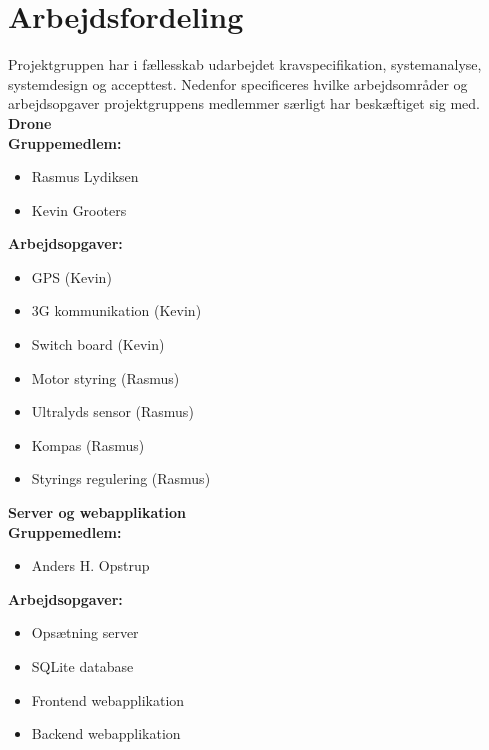 \section{Arbejdsfordeling}

Projektgruppen har i fællesskab udarbejdet kravspecifikation, systemanalyse, systemdesign og accepttest. 
Nedenfor specificeres hvilke arbejdsområder og arbejdsopgaver projektgruppens medlemmer særligt har beskæftiget sig med.\\

{\LARGE \textbf{Drone \vspace{0.2cm}}}\\
\textbf{Gruppemedlem:}
\begin{itemize}
\item Rasmus Lydiksen 
\item Kevin Grooters \\
\end{itemize}

\vspace{-0.3cm}

\textbf{Arbejdsopgaver:}
\begin{itemize}
\item GPS (Kevin)
\item 3G kommunikation (Kevin)
\item Switch board (Kevin)
\item Motor styring (Rasmus)
\item Ultralyds sensor (Rasmus)
\item Kompas (Rasmus)
\item Styrings regulering (Rasmus)\\
\end{itemize}

\vspace{0.5cm}

{\LARGE \textbf{Server og webapplikation \vspace{0.2cm}}}\\
\textbf{Gruppemedlem:}
\begin{itemize}
\item Anders H. Opstrup \\
\end{itemize}

\vspace{-0.3cm}

\textbf{Arbejdsopgaver:}
\begin{itemize}
\item Opsætning server
\item SQLite database
\item Frontend webapplikation
\item Backend webapplikation
\end{itemize}


